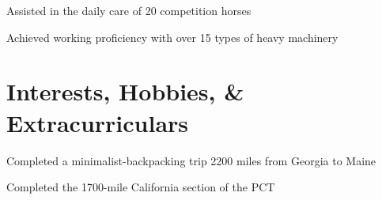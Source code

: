 \documentclass[letterpaper]{deedy-resume} %
\begin{document}
\begin{minipage}[t]{0.66\textwidth}
\sectionspace %



\begin{tightitemize}
\item Assisted in the daily care of 20 competition horses
\item Achieved working proficiency with over 15 types of heavy machinery
\end{tightitemize}

\sectionspace %


\section{Interests, Hobbies, \& Extracurriculars}


Completed a minimalist-backpacking trip 2200 miles from Georgia to Maine

Completed the 1700-mile California section of the PCT

\sectionspace %








\end{minipage}
\end{document}
